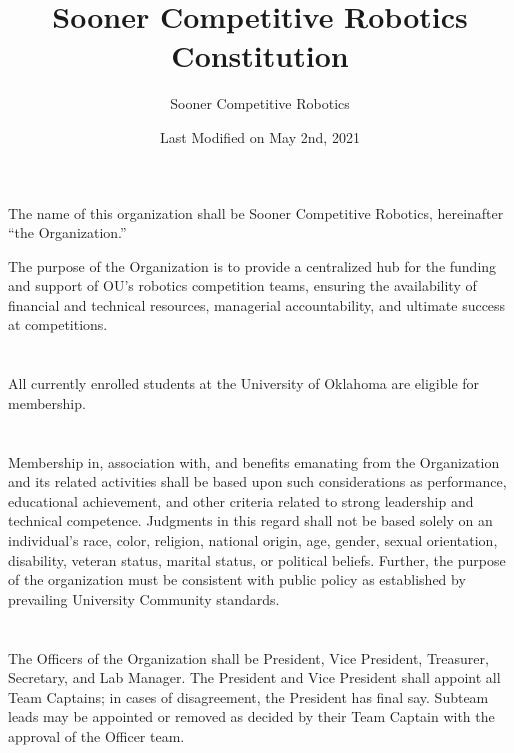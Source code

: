 \documentclass[12pt]{cls/constitution}
\begin{document}
\title{Sooner Competitive Robotics Constitution}
\author{Sooner Competitive Robotics}
\date{Last Modified on May 2nd, 2021}
\maketitle
\setcounter{tocdepth}{0}
\tableofcontents
\newpage


The name of this organization shall be Sooner Competitive Robotics, hereinafter “the Organization.”


The purpose of the Organization is to provide a centralized hub for the funding and support of OU's robotics competition teams, ensuring the availability of financial and technical resources, managerial accountability, and ultimate success at competitions. 


\section{}
All currently enrolled students at the University of Oklahoma are eligible for membership. 

\section{}
Membership in, association with, and benefits emanating from the Organization and its related activities shall be based upon such considerations as performance, educational achievement, and other criteria related to strong leadership and technical competence. Judgments in this regard shall not be based solely on an individual’s race, color, religion, national origin, age, gender, sexual orientation, disability, veteran status, marital status, or political beliefs. Further, the purpose of the organization must be consistent with public policy as established by prevailing University Community standards.  


\section{}
The Officers of the Organization shall be President, Vice President, Treasurer, Secretary, and Lab Manager.
The President and Vice President shall appoint all Team Captains; in cases of disagreement, the President has final say.
Subteam leads may be appointed or removed as decided by their Team Captain with the approval of the Officer team.
\end{document}
